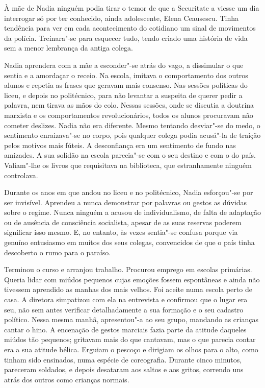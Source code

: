 À mãe de Nadia ninguém podia tirar o temor de que a Securitate a viesse
um dia interrogar só por ter conhecido, ainda adolescente, Elena
Ceausescu. Tinha tendência para ver em cada acontecimento do cotidiano
um sinal de movimentos da polícia. Treinara"-se para esquecer tudo, tendo
criado uma história de vida sem a menor lembrança da antiga colega.

Nadia aprendera com a mãe a esconder"-se atrás do vago, a dissimular o
que sentia e a amordaçar o receio. Na
escola, imitava o comportamento dos outros alunos e repetia as frases
que geravam mais consenso. Nas sessões políticas do liceu, e depois no
politécnico, para não levantar a suspeita de querer pedir a palavra,
nem tirava as mãos do colo. Nessas sessões, onde se discutia a doutrina
marxista e os comportamentos revolucionários, todos os alunos procuravam
não cometer deslizes. Nadia não era diferente. Mesmo tentando desviar"-se
do medo, o sentimento enraizava"-se no corpo, pois qualquer colega
podia acusá"-la de traição pelos motivos mais fúteis. A desconfiança
era um sentimento de fundo nas amizades. A sua solidão na escola
parecia"-se com o seu destino e com o do país. Valiam"-lhe os livros que
requisitava na biblioteca, que estranhamente ninguém controlava.

Durante os anos em que andou no liceu e no politécnico, Nadia esforçou"-se por ser invisível. Aprendeu a nunca demonstrar
por palavras ou gestos as dúvidas sobre o regime. Nunca ninguém a acusou
de individualismo, de falta de adaptação ou de ausência de consciência
socialista, apesar de as suas reservas poderem significar isso mesmo. E,
no entanto, às vezes sentia"-se confusa porque via genuíno entusiasmo em
muitos dos seus colegas, convencidos de que o país tinha descoberto o
rumo para o paraíso.

Terminou o curso e arranjou trabalho. Procurou emprego em escolas
primárias. Queria lidar com miúdos pequenos cujas emoções fossem
espontâneas e ainda não tivessem aprendido as manhas dos mais velhos.
Foi aceite numa escola perto de casa. A diretora simpatizou com ela na
entrevista e confirmou que o lugar era seu, não sem antes verificar
detalhadamente a sua formação e o seu
cadastro político. Nessa mesma manhã, apresentou"-a ao seu grupo,
mandando as crianças cantar o hino. A encenação de gestos marciais
fazia parte da atitude daqueles miúdos tão pequenos; gritavam mais do
que cantavam, mas o que parecia contar era a sua atitude bélica. Erguiam
o pescoço e dirigiam os olhos para o alto, como tinham sido ensinados,
numa espécie de coreografia. Durante cinco minutos, pareceram soldados,
e depois desataram aos saltos e aos gritos, correndo uns atrás dos
outros como crianças normais.

